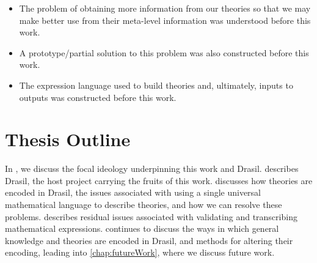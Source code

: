 \begin{itemize}

      \item The problem of obtaining more information from our theories so that
            we may make better use from their meta-level information was
            understood before this work.

      \item A prototype/partial solution to this problem was also constructed before
            this work.

      \item The expression language used to build theories and, ultimately,
            inputs to outputs was constructed before this work.

\end{itemize}

\section{Thesis Outline}
\label{sec:intro:outline}

In , we discuss the focal ideology underpinning this work
and Drasil.  describes Drasil, the host project carrying the
fruits of this work.  discusses how theories are encoded
in Drasil, the issues associated with using a single universal mathematical
language to describe theories, and how we can resolve these problems.
 describes residual issues associated with validating and
transcribing mathematical expressions.  continues to
discuss the ways in which general knowledge and theories are encoded in Drasil,
and methods for altering their encoding, leading into \cref{chap:futureWork},
where we discuss future work.
